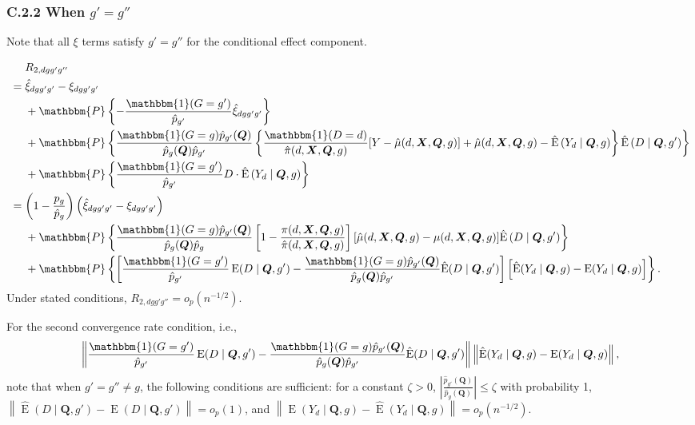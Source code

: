 \documentclass[12pt,a4paper]{article}
\newcommand{\E}{\operatorname{E}}
\def\X{{\boldsymbol X}}
\def\Q{{\boldsymbol Q}}
\def\one{\mathbbm{1}}
\def\P{\mathbbm{P}}
\begin{document}
\subsubsection*{C.2.2 When $g'=g''$}
Note that all $\xi$ terms satisfy $g'=g''$ for the conditional effect component.

\begin{align*}
    &\phantom{{}={}} R_{2,dgg'g''} \\
    &= \hat{\xi}_{dgg'g'} - \xi_{dgg'g'} \\
    &\phantom{{}={}} + \P \left\{- \frac{\one(G=g')}{\hat{p}_{g'}} \hat{\xi}_{dgg'g'} \right\} \\
    &\phantom{{}={}} + \P \left\{ \frac{\one(G=g) \hat{p}_{g'}(\Q)}{\hat{p}_g(\Q)\hat{p}_{g'}} \left\{ \frac{\one(D=d)}{\hat{\pi}(d,\X,\Q,g)} [Y-\hat{\mu}(d,\X,\Q,g)]+\hat{\mu}(d,\X,\Q,g) - \hat{\E} \left(Y_d \mid \Q,g \right) \right\} \hat{\E} \left(D \mid \Q,g' \right) \right\} \\
    &\phantom{{}={}} + \P \left\{ \frac{\one(G=g')}{\hat{p}_{g'}} D \cdot \hat{\E}\left( Y_d \mid \Q, g \right) \right\} \\
    &= \left(1-\frac{p_g}{\hat{p}_g}\right)\left(\hat{\xi}_{dgg'g'} - \xi_{dgg'g'} \right) \\
    &\phantom{{}={}} + \P\left\{ \frac{\one(G=g) \hat{p}_{g'}(\Q) }{\hat{p}_g(\Q) \hat{p}_{g} } \left[ 1-\frac{\pi(d,\X,\Q,g)}{\hat{\pi}(d,\X,\Q,g)} \right]  [\hat{\mu}(d,\X,\Q,g)-\mu(d,\X,\Q,g)]  \hat{\E} \left(D \mid \Q,g' \right) \right\} \\
    &\phantom{{}={}} + \P\left\{ \left[ \frac{\one(G=g') }{\hat{p}_{g'}}\E(D \mid \Q,g') - \frac{\one(G=g) \hat{p}_{g'}(\Q) }{\hat{p}_g(\Q) \hat{p}_{g'} } \hat{\E}(D \mid \Q,g') \right] \left[ \hat{\E}(Y_d \mid \Q,g) - \E(Y_d \mid \Q,g) \right] \right\}.
\end{align*}
Under stated conditions, $R_{2,dgg'g''}=o_p(n^{-1/2})$. 

For the second convergence rate condition, i.e., 
$$\left\| \frac{\one(G=g') }{\hat{p}_{g'}}\E(D \mid \Q,g') - \frac{\one(G=g) \hat{p}_{g'}(\Q) }{\hat{p}_g(\Q) \hat{p}_{g'} } \hat{\E}(D \mid \Q,g') \right\| \left\| \hat{\E}(Y_d \mid \Q,g) - \E(Y_d \mid \Q,g) \right\|,$$
note that when $g'=g'' \neq g$, the following conditions are sufficient: for a constant $\zeta>0$, $\left| \frac{\hat{p}_{g'}(\Q)}{\hat{p}_{g}(\Q)}\right| \leq \zeta$ with probability 1, $\left\| \hat{\E}(D \mid \Q, g') - \E(D \mid \Q, g') \right\|=o_p(1)$, and $\left\| \E(Y_d \mid \Q,g) - \hat{\E}\left( Y_d \mid \Q, g \right) \right\|=o_p(n^{-1/2})$. 
\end{document}
